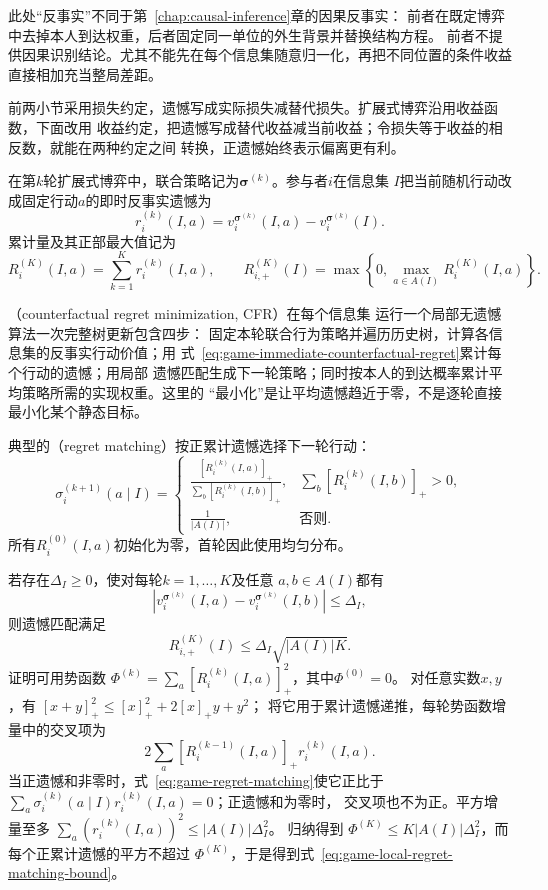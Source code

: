 此处“反事实”不同于第~\ref{chap:causal-inference}章的因果反事实：
前者在既定博弈中去掉本人到达权重，后者固定同一单位的外生背景并替换结构方程。
前者不提供因果识别结论。尤其不能先在每个信息集随意归一化，再把不同位置的条件收益
直接相加充当整局差距。

前两小节采用损失约定，遗憾写成实际损失减替代损失。扩展式博弈沿用收益函数，下面改用
收益约定，把遗憾写成替代收益减当前收益；令损失等于收益的相反数，就能在两种约定之间
转换，正遗憾始终表示偏离更有利。

在第\(k\)轮扩展式博弈中，联合策略记为\(\bm{\sigma}^{(k)}\)。参与者\(i\)在信息集
\(I\)把当前随机行动改成固定行动\(a\)的即时反事实遗憾为
\begin{equation}
  r_i^{(k)}(I,a)
  =
  v_i^{\bm{\sigma}^{(k)}}(I,a)
  -
  v_i^{\bm{\sigma}^{(k)}}(I).
  \label{eq:game-immediate-counterfactual-regret}
\end{equation}
累计量及其正部最大值记为
\[
  R_i^{(K)}(I,a)
  =
  \sum_{k=1}^{K}r_i^{(k)}(I,a),
  \qquad
  R_{i,+}^{(K)}(I)
  =
  \max\left\{0,\max_{a\in A(I)}R_i^{(K)}(I,a)\right\}.
\]

（counterfactual regret minimization, CFR）在每个信息集
运行一个局部无遗憾算法一次完整树更新包含四步：
固定本轮联合行为策略并遍历历史树，计算各信息集的反事实行动价值；用
式~\eqref{eq:game-immediate-counterfactual-regret}累计每个行动的遗憾；用局部
遗憾匹配生成下一轮策略；同时按本人的到达概率累计平均策略所需的实现权重。这里的
“最小化”是让平均遗憾趋近于零，不是逐轮直接最小化某个静态目标。

典型的（regret matching）按正累计遗憾选择下一轮行动：
\begin{equation}
  \sigma_i^{(k+1)}(a\mid I)
  =
  \begin{cases}
    \displaystyle
    \frac{[R_i^{(k)}(I,a)]_+}
         {\sum_b[R_i^{(k)}(I,b)]_+},
      &\sum_b[R_i^{(k)}(I,b)]_+>0,\\[8pt]
    \displaystyle\frac{1}{|A(I)|},
      &\text{否则}.
  \end{cases}
  \label{eq:game-regret-matching}
\end{equation}
所有\(R_i^{(0)}(I,a)\)初始化为零，首轮因此使用均匀分布。

若存在\(\Delta_I\geq0\)，使对每轮\(k=1,\ldots,K\)及任意
\(a,b\in A(I)\)都有
\[
  \left|
    v_i^{\bm{\sigma}^{(k)}}(I,a)
    -
    v_i^{\bm{\sigma}^{(k)}}(I,b)
  \right|
  \leq\Delta_I,
\]
则遗憾匹配满足
\begin{equation}
  R_{i,+}^{(K)}(I)
  \leq
  \Delta_I\sqrt{|A(I)|K}.
  \label{eq:game-local-regret-matching-bound}
\end{equation}
证明可用势函数
\(\Phi^{(k)}=\sum_a[R_i^{(k)}(I,a)]_+^2\)，其中\(\Phi^{(0)}=0\)。
对任意实数\(x,y\)，有
\([x+y]_+^2\leq[x]_+^2+2[x]_+y+y^2\)；
将它用于累计遗憾递推，每轮势函数增量中的交叉项为
\[
  2\sum_a[R_i^{(k-1)}(I,a)]_+r_i^{(k)}(I,a).
\]
当正遗憾和非零时，式~\eqref{eq:game-regret-matching}使它正比于
\(\sum_a\sigma_i^{(k)}(a\mid I)r_i^{(k)}(I,a)=0\)；正遗憾和为零时，
交叉项也不为正。平方增量至多
\(\sum_a(r_i^{(k)}(I,a))^2\leq |A(I)|\Delta_I^2\)。
归纳得到
\(\Phi^{(K)}\leq K|A(I)|\Delta_I^2\)，而每个正累计遗憾的平方不超过
\(\Phi^{(K)}\)，于是得到式~\eqref{eq:game-local-regret-matching-bound}。

